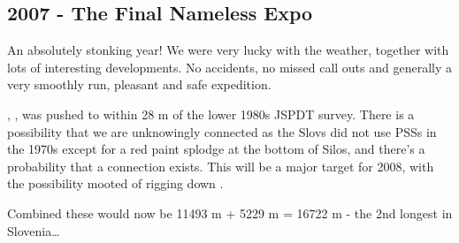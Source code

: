 \begin{tcolorbox}
\chapter{2007 - The Final Nameless Expo}
An absolutely stonking year! We were very lucky with the weather, together with lots of
interesting developments. No accidents, no missed call outs and generally a very smoothly run, pleasant and safe expedition.

, , was pushed to within 28 m of the lower  1980s JSPDT survey. There is a possibility that we are unknowingly connected as the Slovs did not use PSSs in the 1970s except for a red paint splodge at the bottom of Silos, and there's a probability that a connection exists. This will be a major target for 2008, with the possibility mooted of rigging down .

Combined these would now be 11493 m + 5229 m = 16722 m - the 2nd longest in Slovenia\ldots{}

\end{tcolorbox}
\BgThispage
